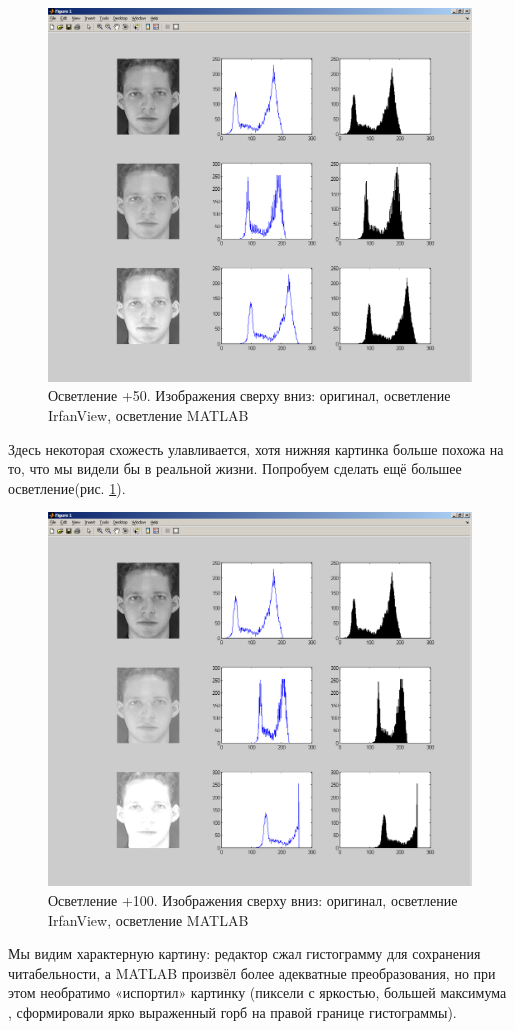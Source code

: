 \documentclass[a4paper,12pt,titlpage]{posobie}
\begin{document}
\begin{figure}[h]
   \includegraphics[width=\textwidth]{report/pic_2.png}
   \caption{Осветление +50. Изображения сверху вниз: оригинал, осветление IrfanView, осветление MATLAB}\label{fig:faces_irfan_1}
\end{figure}
Здесь некоторая схожесть улавливается, хотя нижняя картинка больше похожа на то, что мы видели бы в 
реальной жизни. Попробуем сделать ещё большее осветление(рис. \ref{fig:faces_irfan_1}).
\begin{figure}[h]
   \includegraphics[width=\textwidth]{report/pic_3.png}
   \caption{Осветление +100. Изображения сверху вниз: оригинал, осветление IrfanView, осветление MATLAB}\label{fig:faces_irfan_2}
\end{figure}
Мы видим характерную картину: редактор сжал гистограмму для сохранения читабельности, а MATLAB произвёл более адекватные 
преобразования, но при этом необратимо «испортил» картинку (пиксели с яркостью, большей максимума
, сформировали ярко выраженный горб на правой границе гистограммы). 
\end{document}
